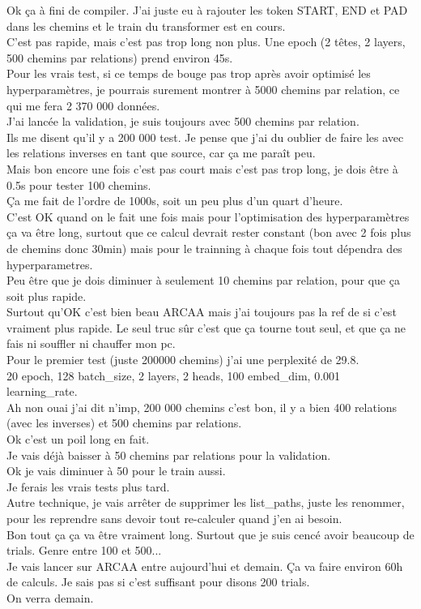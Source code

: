 \documentclass{article}
\begin{document}
Ok ça à fini de compiler. J'ai juste eu à rajouter les token START, END et PAD dans les chemins et le train du transformer est en cours.\\
C'est pas rapide, mais c'est pas trop long non plus. Une epoch (2 têtes, 2 layers, 500 chemins par relations) prend environ 45s.\\
Pour les vrais test, si ce temps de bouge pas trop après avoir optimisé les hyperparamètres, je pourrais surement montrer à 5000 chemins par relation, ce qui me fera 2 370 000 données.\\
J'ai lancée la validation, je suis toujours avec 500 chemins par relation.\\
Ils me disent qu'il y a 200 000 test. Je pense que j'ai du oublier de faire les avec les relations inverses en tant que source, car ça me paraît peu.\\
Mais bon encore une fois c'est pas court mais c'est pas trop long, je dois être à 0.5s pour tester 100 chemins.\\
Ça me fait de l'ordre de 1000s, soit un peu plus d'un quart d'heure.\\
C'est OK quand on le fait une fois mais pour l'optimisation des hyperparamètres ça va être long, surtout que ce calcul devrait rester constant (bon avec 2 fois plus de chemins donc 30min) mais pour le trainning à chaque fois tout dépendra des hyperparametres.\\
Peu être que je dois diminuer à seulement 10 chemins par relation, pour que ça soit plus rapide.\\
Surtout qu'OK c'est bien beau ARCAA mais j'ai toujours pas la ref de si c'est vraiment plus rapide. Le seul truc sûr c'est que ça tourne tout seul, et que ça ne fais ni souffler ni chauffer mon pc.\\
Pour le premier test (juste 200000 chemins) j'ai une perplexité de 29.8.\\
20 epoch, 128 batch\_size, 2 layers, 2 heads, 100 embed\_dim, 0.001 learning\_rate.\\
Ah non ouai j'ai dit n'imp, 200 000 chemins c'est bon, il y a bien 400 relations (avec les inverses) et 500 chemins par relations.\\
Ok c'est un poil long en fait.\\
Je vais déjà baisser à 50 chemins par relations pour la validation.\\
Ok je vais diminuer à 50 pour le train aussi.\\
Je ferais les vrais tests plus tard.\\
Autre technique, je vais arrêter de supprimer les list\_paths, juste les renommer, pour les reprendre sans devoir tout re-calculer quand j'en ai besoin.\\
Bon tout ça ça va être vraiment long. Surtout que je suis cencé avoir beaucoup de trials. Genre entre 100 et 500...\\
Je vais lancer sur ARCAA entre aujourd'hui et demain. Ça va faire environ 60h de calculs. Je sais pas si c'est suffisant pour disons 200 trials.\\
On verra demain.\\
\end{document}
